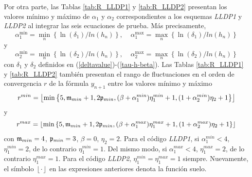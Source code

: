 Por otra parte, las Tablas \ref{tab:R_LLDP1} y \ref{tab:R_LLDP2} presentan los valores mínimo y máximo de $\alpha _{1}$ y $\alpha _{2}$ correspondientes a los esquemas \emph{LLDP1} y \emph{LLDP2} al integrar las seis ecuaciones de prueba. Más precisamente,
\[\alpha _{1}^{\min }=\underset{n}{\min }\left\{ \ln (\delta
_{1})/ln(h_{n})\right\}, \;\;\;\; \alpha _{1}^{\max }=\underset{n}{\max }\left\{
\ln (\delta _{1})/ln(h_{n})\right\}\]
y
\[\alpha _{2}^{\min }=\underset{n}{\min }\left\{ \ln (\delta _{2})/ln(h_{n})\right\}, \;\;\;\; \alpha _{2}^{\max }=\underset{n}{\max }\left\{ \ln (\delta _{2})/ln(h_{n})\right\} \]
con $\delta_{1}$ y $\delta_{2}$ definidos en (\ref{deltavalue})-(\ref{tau-h-beta}). Las Tablas \ref{tab:R_LLDP1} y \ref{tab:R_LLDP2} también presentan el rango de fluctuaciones en el orden de convergencia $r$ de la fórmula $y_{n+1}$ entre los valores mínimo y máximo
\[r^{min}=\left\lfloor\mathrm{min}\left\{5,\mathfrak{m}_{min}+1,2\mathfrak{p}_{min},(\beta+\alpha^{min}_1)\eta^{min}_1+1,(1+\alpha^{min}_2)\eta_2+1 \right\} \right\rfloor\]
y
\[r^{max}=\left\lfloor\mathrm{min}\left\{5,\mathfrak{m}_{min}+1,2\mathfrak{p}_{min},(\beta+\alpha^{max}_1)\eta^{max}_1+1,(1+\alpha^{max}_2)\eta_2+1 \right\} \right\rfloor\]
con $\mathfrak{m}_{min}=4$, $\mathfrak{p}_{min}=3$, $\beta=0$, $\eta_2=2$. Para el código \emph{LLDP1}, si $\alpha^{min}_1 < 4$, $\eta^{min}_1=2$, de lo contrario $\eta^{min}_1=1$. Del mismo modo, si $\alpha^{max}_1 < 4$, $\eta^{max}_1=2$, de lo contrario $\eta^{max}_1=1$. Para el código \emph{LLDP2}, $\eta^{min}_1=\eta^{max}_1=1$ siempre. Nuevamente, el símbolo $\left\lfloor \cdot \right\rfloor$ en las expresiones anteriores denota la función suelo.


